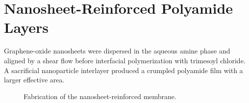 \chapter{Nanosheet-Reinforced Polyamide Layers}
\label{ch:method}

Graphene-oxide nanosheets were dispersed in the aqueous amine phase and aligned by a shear flow
before interfacial polymerization with trimesoyl chloride. A sacrificial nanoparticle
interlayer produced a crumpled polyamide film with a larger effective area.

\begin{figure}[htbp]
  \centering
  \caption{Fabrication of the nanosheet-reinforced membrane.}
  \label{fig:fab}
\end{figure}
